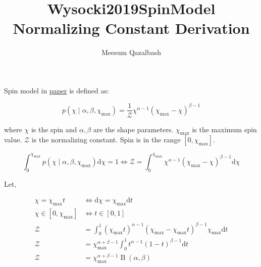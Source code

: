 \documentclass{article}
\title{Wysocki2019SpinModel Normalizing Constant Derivation}
\author{Meesum Qazalbash}
\newcommand{\xm}{\chi_\text{max}}
\newcommand{\Z}{\mathcal{Z}}
\newcommand{\diff}[1]{\mathrm{d}{#1}}
\begin{document}
\maketitle

Spin model in \href{https://arxiv.org/abs/1805.06442}{paper} is defined as:

\begin{equation}
    \label{eq:spinmodel}
    p(\chi\mid\alpha,\beta,\xm) = \frac{1}{\Z}\chi^{\alpha-1}\left(\xm-\chi\right)^{\beta-1}
\end{equation}

where \(\chi\) is the spin and \(\alpha,\beta\) are the shape parameters. \(\xm\) is the maximum spin value. \(\Z\) is the normalizing constant. Spin is in the range \([0,\xm]\).

\begin{equation}
    \int_{0}^{\xm}p(\chi\mid\alpha,\beta,\xm)\diff{\chi} = 1 \iff \Z = \int_{0}^{\xm}\chi^{\alpha-1}\left(\xm-\chi\right)^{\beta-1}\diff{\chi}
\end{equation}

Let,

\begin{align}
    \chi = \xm t   & \iff \diff{\chi} = \xm\diff{ t}                                                         \\
    \chi\in[0,\xm] & \iff  t\in[0,1]                                                                         \\
    \Z             & = \int_{0}^{1}\left(\xm t\right)^{\alpha-1}\left(\xm-\xm t\right)^{\beta-1}\xm\diff{ t} \\
    \Z             & = \xm^{\alpha+\beta-1}\int_{0}^{1} t^{\alpha-1}\left(1- t\right)^{\beta-1}\diff{ t}     \\
    \Z             & = \xm^{\alpha+\beta-1}\operatorname{B}\left(\alpha,\beta\right)
\end{align}
\end{document}
